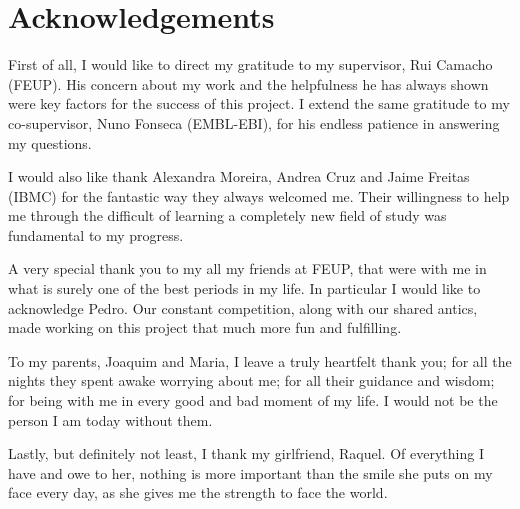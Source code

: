 \chapter*{Acknowledgements}

First of all, I would like to direct my gratitude to my supervisor, Rui Camacho
(FEUP). His concern about my work and the helpfulness he has always shown were
key factors for the success of this project. I extend the same gratitude to my
co-supervisor, Nuno Fonseca (EMBL-EBI), for his endless patience in answering my
questions.

I would also like thank Alexandra Moreira, Andrea Cruz and Jaime Freitas (IBMC)
for the fantastic way they always welcomed me. Their willingness to help me
through the difficult of learning a completely new field of study was
fundamental to my progress.

A very special thank you to my all my friends at FEUP, that were with me in what
is surely one of the best periods in my life. In particular I would like to
acknowledge Pedro. Our constant competition, along with our shared antics, made
working on this project that much more fun and fulfilling.

To my parents, Joaquim and Maria, I leave a truly heartfelt thank you; for all
the nights they spent awake worrying about me; for all their guidance and
wisdom; for being with me in every good and bad moment of my life. I would not
be the person I am today without them.

Lastly, but definitely not least, I thank my girlfriend, Raquel. Of everything I
have and owe to her, nothing is more important than the smile she puts on my
face every day, as she gives me the strength to face the world.

\vspace{10mm}
